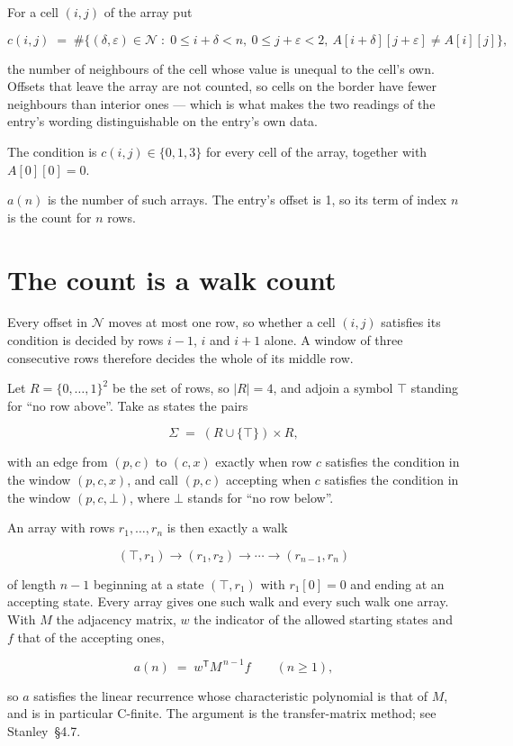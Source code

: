 \documentclass[11pt]{article}
\theoremstyle{definition}
\begin{document}
For a cell $(i,j)$ of the array put

\[c(i,j) \;=\; \#\bigl\{(\delta,\varepsilon)\in\mathcal{N} \;:\; 0\le i+\delta<n,\ 0\le j+\varepsilon<2,\ A[i+\delta][j+\varepsilon] \neq A[i][j]\bigr\},\]

the number of neighbours of the cell whose value is unequal to the cell's own. Offsets that leave the array are not counted, so cells on the border have fewer neighbours than interior ones --- which is what makes the two readings of the entry's wording distinguishable on the entry's own data.

The condition is $c(i,j) \in \{0, 1, 3\}$ for every cell of the array, together with $A[0][0]=0$.

$a(n)$ is the number of such arrays. The entry's offset is 1, so its term of index $n$ is the count for $n$ rows.

\section{The count is a walk count}

Every offset in $\mathcal{N}$ moves at most one row, so whether a cell $(i,j)$ satisfies its condition is decided by rows $i-1$, $i$ and $i+1$ alone. A window of three consecutive rows therefore decides the whole of its middle row.

Let $R = \{0,\dots,1\}^{2}$ be the set of rows, so $|R| = 4$, and adjoin a symbol $\top$ standing for ``no row above''. Take as states the pairs

\[\Sigma \;=\; (R \cup \{\top\}) \times R,\]

with an edge from $(p,c)$ to $(c,x)$ exactly when row $c$ satisfies the condition in the window $(p,c,x)$, and call $(p,c)$ accepting when $c$ satisfies the condition in the window $(p,c,\bot)$, where $\bot$ stands for ``no row below''.

An array with rows $r_1,\dots,r_n$ is then exactly a walk

\[(\top,r_1) \to (r_1,r_2) \to \cdots \to (r_{n-1},r_n)\]

of length $n-1$ beginning at a state $(\top,r_1)$ with $r_1[0]=0$ and ending at an accepting state. Every array gives one such walk and every such walk one array. With $M$ the adjacency matrix, $w$ the indicator of the allowed starting states and $f$ that of the accepting ones,

\[a(n) \;=\; w^{\mathsf T} M^{\,n-1} f \qquad (n \ge 1),\]

so $a$ satisfies the linear recurrence whose characteristic polynomial is that of $M$, and is in particular C-finite. The argument is the transfer-matrix method; see Stanley~\S4.7.
\end{document}
